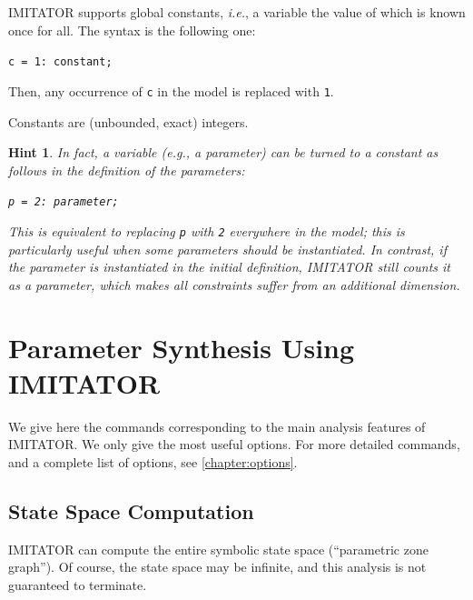 \documentclass[a4paper,11pt]{report}
\makeatletter
\newcommand{\imitator}{\textsf{IMITATOR}}
\newtheorem{hint}{Hint}
\newcommand{\styleIMI}[1]{\textcolor{imicolor}{\texttt{#1}}}
\newcommand{\eg}{\textcolor{colorok}{\textit{e.g.},\@}}
\newcommand{\ie}{\textcolor{colorok}{\textit{i.e.},\@}}
\makeatother
\begin{document}
\imitator{} supports global constants, \ie{} a variable the value of which is known once for all.
The syntax is the following one:
	\begin{center}
		\styleIMI{c = 1: constant;}
	\end{center}
Then, any occurrence of \styleIMI{c} in the model is replaced with \styleIMI{1}.

Constants are (unbounded, exact) integers.


\begin{hint}
	In fact, a variable (\eg{} a parameter) can be turned to a constant as follows in the definition of the parameters:
	\begin{center}
		\styleIMI{p = 2: parameter;}
	\end{center}
	This is equivalent to replacing \styleIMI{p} with \styleIMI{2} everywhere in the model; this is particularly useful when some parameters should be instantiated.
	In contrast, if the parameter is instantiated in the initial definition, \imitator{} still counts it as a parameter, which makes all constraints suffer from an additional dimension.
\end{hint}





\chapter{Parameter Synthesis Using IMITATOR}


We give here the commands corresponding to the main analysis features of \imitator{}.
We only give the most useful options.
For more detailed commands, and a complete list of options, see \cref{chapter:options}.


\section{State Space Computation}\label{ss:mode:statespace}

\imitator{} can compute the entire symbolic state space (``parametric zone graph'').
Of course, the state space may be infinite, and this analysis is not guaranteed to terminate.
\end{document}
